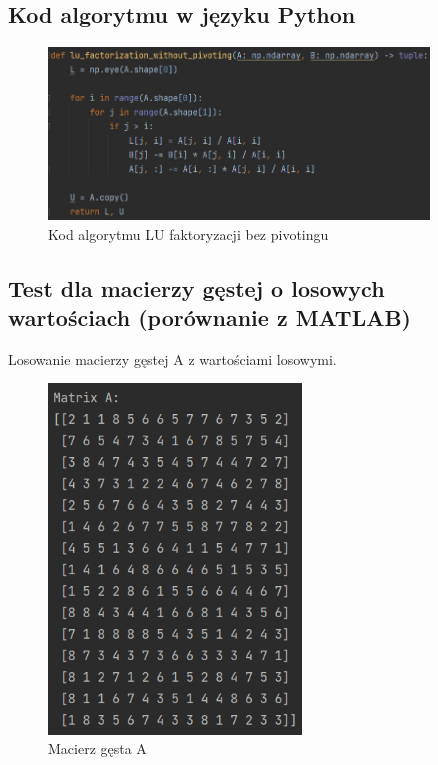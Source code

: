 \documentclass[9pt]{article}
\begin{document}
\subsection{Kod algorytmu w języku Python}

\begin{figure}[h]
  \centering
  \includegraphics[width=0.9\textwidth]{lu_factorization_without_pivoting.jpg}
  \caption{Kod algorytmu LU faktoryzacji bez pivotingu}
\end{figure}
\newpage

\subsection{Test dla macierzy gęstej o losowych wartościach (porównanie z MATLAB)}

Losowanie macierzy gęstej A z wartościami losowymi.

\begin{figure}[h]
  \centering
  \includegraphics[width=0.6\textwidth]{matrix_A_3.jpg}
  \caption{Macierz gęsta A}
\end{figure}
\newpage
\end{document}
